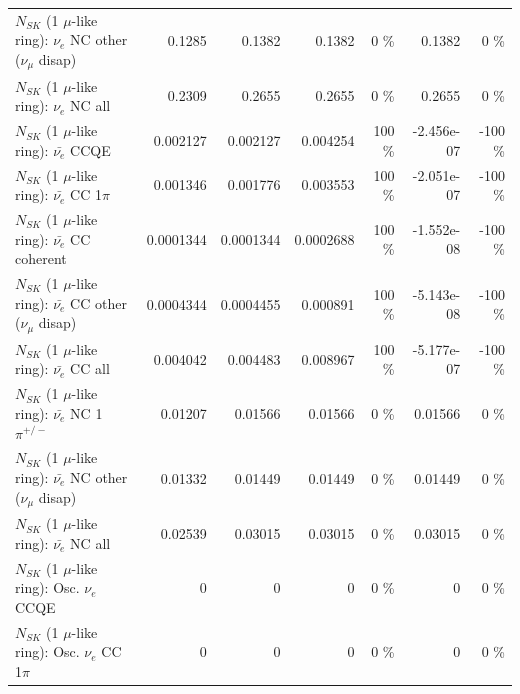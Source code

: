 \begin{table}
\begin{tabular}{| l | r | r | r  r | r  r |}
                $N_{SK}$ (1 $\mu$-like ring): $\nu_e$ NC other ($\nu_\mu$ disap) &          0.1285 &          0.1382 &          0.1382 &        0 \%  &          0.1382 &        0 \%  \\ 
                                  $N_{SK}$ (1 $\mu$-like ring): $\nu_{e}$ NC all &          0.2309 &          0.2655 &          0.2655 &        0 \%  &          0.2655 &        0 \%  \\ 
\hline
\hline
\hline
                                $N_{SK}$ (1 $\mu$-like ring): $\bar{\nu_e}$ CCQE &        0.002127 &        0.002127 &        0.004254 &      100 \%  &      -2.456e-07 &     -100 \%  \\ 
                           $N_{SK}$ (1 $\mu$-like ring): $\bar{\nu_e}$ CC 1$\pi$ &        0.001346 &        0.001776 &        0.003553 &      100 \%  &      -2.051e-07 &     -100 \%  \\ 
                         $N_{SK}$ (1 $\mu$-like ring): $\bar{\nu_e}$ CC coherent &       0.0001344 &       0.0001344 &       0.0002688 &      100 \%  &      -1.552e-08 &     -100 \%  \\ 
          $N_{SK}$ (1 $\mu$-like ring): $\bar{\nu_e}$ CC other ($\nu_\mu$ disap) &       0.0004344 &       0.0004455 &        0.000891 &      100 \%  &      -5.143e-08 &     -100 \%  \\ 
                            $N_{SK}$ (1 $\mu$-like ring): $\bar{\nu_{e}}$ CC all &        0.004042 &        0.004483 &        0.008967 &      100 \%  &      -5.177e-07 &     -100 \%  \\ 
\hline
                     $N_{SK}$ (1 $\mu$-like ring): $\bar{\nu_e}$ NC 1$\pi^{+/-}$ &         0.01207 &         0.01566 &         0.01566 &        0 \%  &         0.01566 &        0 \%  \\ 
          $N_{SK}$ (1 $\mu$-like ring): $\bar{\nu_e}$ NC other ($\nu_\mu$ disap) &         0.01332 &         0.01449 &         0.01449 &        0 \%  &         0.01449 &        0 \%  \\ 
                            $N_{SK}$ (1 $\mu$-like ring): $\bar{\nu_{e}}$ NC all &         0.02539 &         0.03015 &         0.03015 &        0 \%  &         0.03015 &        0 \%  \\ 
\hline
\hline
\hline
                                 $N_{SK}$ (1 $\mu$-like ring): Osc. $\nu_e$ CCQE &               0 &               0 &               0 &        0 \%  &               0 &        0 \%  \\ 
                            $N_{SK}$ (1 $\mu$-like ring): Osc. $\nu_e$ CC 1$\pi$ &               0 &               0 &               0 &        0 \%  &               0 &        0 \%  \\ 

\end{tabular}
\end{table}
